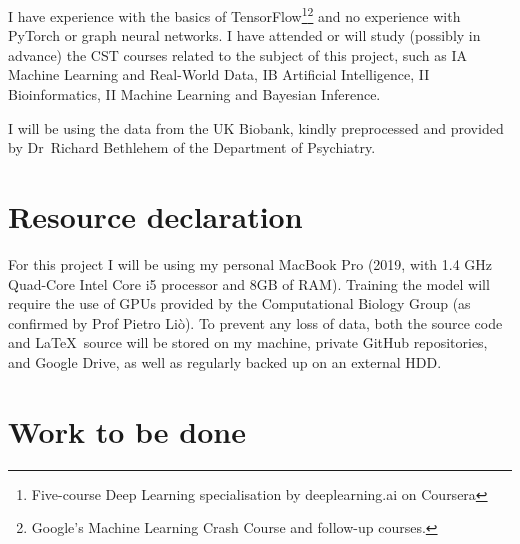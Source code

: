 \documentclass[12pt,a4paper,twoside]{article}
\begin{document}
I have experience with the basics of TensorFlow\footnote{Five-course Deep Learning specialisation by deeplearning.ai on Coursera}\footnote{Google's Machine Learning Crash Course and follow-up courses.} and no experience with PyTorch or graph neural networks. I have attended or will study (possibly in advance) the CST courses related to the subject of this project, such as IA Machine Learning and Real-World Data, IB Artificial Intelligence, II Bioinformatics, II Machine Learning and Bayesian Inference.

I will be using the data from the UK Biobank, kindly preprocessed and provided by Dr~Richard Bethlehem of the Department of Psychiatry.

\section*{Resource declaration}

For this project I will be using my personal MacBook Pro (2019, with 1.4 GHz Quad-Core Intel Core i5 processor and 8GB of RAM). Training the model will require the use of GPUs provided by the Computational Biology Group (as confirmed by Prof Pietro Liò). To prevent any loss of data, both the source code and \LaTeX\ source will be stored on my machine, private GitHub repositories, and Google Drive, as well as regularly backed up on an external HDD.

\section*{Work to be done}
\label{section:work}

\end{document}
